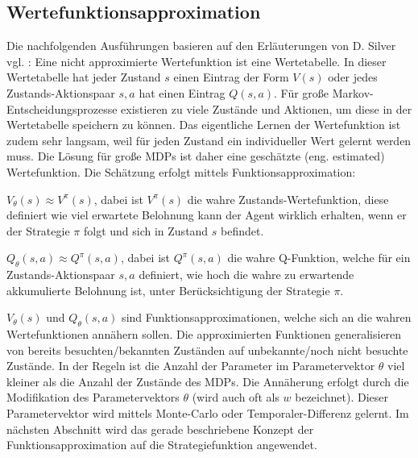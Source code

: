 \documentclass[conference]{IEEEtran}
\begin{document}
\subsection{Wertefunktionsapproximation}
Die nachfolgenden Ausführungen basieren auf den Erläuterungen von D. Silver vgl. \cite{silver_15}: Eine nicht approximierte Wertefunktion ist eine Wertetabelle. In dieser Wertetabelle hat jeder Zustand $s$ einen Eintrag der Form $V(s)$ oder jedes Zustands-Aktionspaar $s, a$ hat einen Eintrag $Q(s,a)$. Für große Markov-Entscheidungsprozesse existieren zu viele Zustände und Aktionen, um diese in der Wertetabelle speichern zu können. Das eigentliche Lernen der Wertefunktion ist zudem sehr langsam, weil für jeden Zustand ein individueller Wert gelernt werden muss. Die Lösung für große MDPs ist daher eine geschätzte (eng. estimated) Wertefunktion. Die Schätzung erfolgt mittels Funktionsapproximation:

$V_{\theta}(s) \approx V^{\pi}(s)$, dabei ist $V^{\pi}(s)$ die wahre Zustands-Wertefunktion, diese definiert wie viel erwartete Belohnung kann der Agent wirklich erhalten, wenn er der Strategie $\pi$ folgt und sich in Zustand $s$ befindet.

$Q_{\theta}(s, a) \approx Q^{\pi}(s, a)$, dabei ist $Q^{\pi}(s, a)$ die wahre Q-Funktion, welche für ein Zustands-Aktionspaar $s, a$ definiert, wie hoch die wahre zu erwartende akkumulierte Belohnung ist, unter Berücksichtigung der Strategie $\pi$.

$V_{\theta}(s)$ und $Q_{\theta}(s, a)$ sind Funktionsapproximationen, welche sich an die wahren Wertefunktionen annähern sollen. Die approximierten Funktionen generalisieren von bereits besuchten/bekannten Zuständen auf unbekannte/noch nicht besuchte Zustände. In der Regeln ist die Anzahl der Parameter im Parametervektor $\theta$ viel kleiner als die Anzahl der Zustände des MDPs. Die Annäherung erfolgt durch die Modifikation des Parametervektors $\theta$ (wird auch oft als $w$ bezeichnet). Dieser Parametervektor wird mittels Monte-Carlo oder Temporaler-Differenz gelernt. Im nächsten Abschnitt wird das gerade beschriebene Konzept der Funktionsapproximation auf die Strategiefunktion angewendet.
\end{document}
